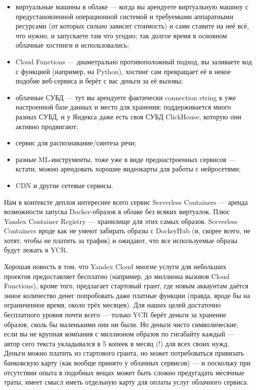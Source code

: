 \documentclass{../../text-style}
\begin{document}
\begin{itemize}
    \item виртуальные машины в облаке --- когда вы арендуете виртуальную машину с предустановленной операционной системой и требуемыми аппаратными ресурсами (от которых сильно зависит стоимость) и сами ставите на неё всё, что нужно, и запускаете там что угодно; так долгое время в основном облачные хостинги и использовались;
    \item Cloud Functions --- диаметрально противоположный подход, вы заливаете код с функцией (например, на Python), хостинг сам превращает её в некое подобие веб-сервиса и берёт с вас деньги за её вызовы;
    \item облачные СУБД --- тут вы арендуете фактически connection string к уже настроенной базе данных и место для хранения; поддерживается много разных СУБД, и у Яндекса даже есть своя СУБД ClickHouse, которую они активно продвигают;
    \item сервис для распознавание/синтеза речи;
    \item разные ML-инструменты, тоже уже в виде преднастроенных сервисов --- кстати, можно арендовать хорошие видеокарты для работы с нейросетями;
    \item CDN и другие сетевые сервисы.
\end{itemize}

Нам в контексте деплоя интереснее всего сервис Serverless Containers --- аренда возможности запуска Docker-образов в облаке без всяких виртуалок. Плюс Yandex Container Registry --- хранилище для этих самых образов. Serverless Containers вроде как не умеют забирать образы с DockerHub (и, скорее всего, не хотят, чтобы не платить за трафик) и ожидают, что все используемые образы будут лежать в YCR.

Хорошая новость в том, что Yandex Cloud многие услуги для небольших проектов предоставляет бесплатно (например, до миллиона вызовов Cloud Functions), кроме того, предлагает стартовый грант, где новым аккаунтам даётся энное количество денег попробовать даже платные функции (правда, вроде бы на ограниченное время, около трёх месяцев). Для наших целей достаточно бесплатного уровня почти всего --- только YCR берёт деньги за хранение образов, сколь бы маленькими они ни были. Но деньги чисто символические, если вы не крупная компания с миллионом образов по гигабайту каждый --- автор сего текста укладывался в 5 копеек в месяц (!) для всех своих нужд. Деньги можно платить из стартового гранта, но может потребоваться привязать банковскую карту (как вообще принято у облачных сервисов) --- и поскольку при отсутствии опыта в подобных вещах может быть сложно предугадать месячные траты, имеет смысл иметь отдельную карту для оплаты услуг облачного сервиса.
\end{document}
